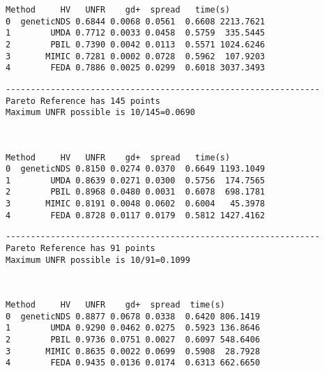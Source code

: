\documentclass[11pt]{article}
\begin{document}
    
    \begin{Verbatim}[commandchars=\\\{\}]
       Method     HV   UNFR    gd+  spread   time(s)
0  geneticNDS 0.6844 0.0068 0.0561  0.6608 2213.7621
1        UMDA 0.7712 0.0033 0.0458  0.5759  335.5445
2        PBIL 0.7390 0.0042 0.0113  0.5571 1024.6246
3       MIMIC 0.7281 0.0002 0.0728  0.5962  107.9203
4        FEDA 0.7886 0.0025 0.0299  0.6018 3037.3493
    \end{Verbatim}

    
    \begin{Verbatim}[commandchars=\\\{\}]
---------------------------------------------------------------
Pareto Reference has 145 points
Maximum UNFR possible is 10/145=0.0690
    \end{Verbatim}

    \begin{center}
    \end{center}
    { \hspace*{\fill} \\}
    
    
    \begin{Verbatim}[commandchars=\\\{\}]
       Method     HV   UNFR    gd+  spread   time(s)
0  geneticNDS 0.8150 0.0274 0.0370  0.6649 1193.1049
1        UMDA 0.8639 0.0271 0.0300  0.5756  174.7565
2        PBIL 0.8968 0.0480 0.0031  0.6078  698.1781
3       MIMIC 0.8191 0.0048 0.0602  0.6004   45.3978
4        FEDA 0.8728 0.0117 0.0179  0.5812 1427.4162
    \end{Verbatim}

    
    \begin{Verbatim}[commandchars=\\\{\}]
---------------------------------------------------------------
Pareto Reference has 91 points
Maximum UNFR possible is 10/91=0.1099
    \end{Verbatim}

    \begin{center}
    \end{center}
    { \hspace*{\fill} \\}
    
    
    \begin{Verbatim}[commandchars=\\\{\}]
       Method     HV   UNFR    gd+  spread  time(s)
0  geneticNDS 0.8877 0.0678 0.0338  0.6420 806.1419
1        UMDA 0.9290 0.0462 0.0275  0.5923 136.8646
2        PBIL 0.9736 0.0751 0.0027  0.6097 548.6406
3       MIMIC 0.8635 0.0022 0.0699  0.5908  28.7928
4        FEDA 0.9435 0.0136 0.0174  0.6313 662.6650
    \end{Verbatim}
\end{document}
